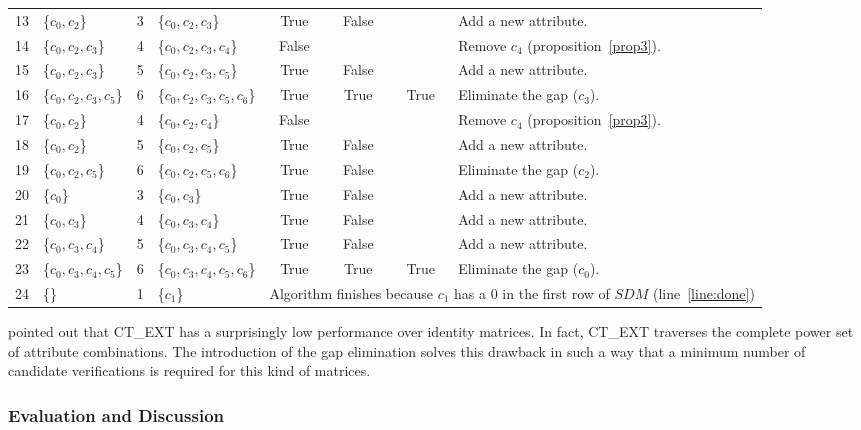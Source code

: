 \documentclass[authoryear,11pt]{elsarticle}
\begin{document}
\begin{table}[!htb]
\begin{tabular}{|c|l|c|l|c|c|c|l|}
    		13 & \{$c_0,c_2$\} 			& 3 & \{$c_0,c_2,c_3$\}			& True & False &   & Add a new attribute.\\
    		14 & \{$c_0,c_2,c_3$\} 		& 4 & \{$c_0,c_2,c_3,c_4$\}		& False &   &   & Remove $c_4$ (proposition~\ref{prop3}).\\
    		15 & \{$c_0,c_2,c_3$\}		& 5 & \{$c_0,c_2,c_3,c_5$\}		& True & False &   & Add a new attribute.\\
    		16 & \{$c_0,c_2,c_3,c_5$\}	& 6 & \{$c_0,c_2,c_3,c_5,c_6$\} 	& True & True & True & Eliminate the gap ($c_3$).\\
    		17 & \{$c_0,c_2$\} 			& 4 & \{$c_0,c_2,c_4$\}			& False &   &   & Remove $c_4$ (proposition~\ref{prop3}).\\
    		18 & \{$c_0,c_2$\}			& 5 & \{$c_0,c_2,c_5$\}			& True & False &   & Add a new attribute.\\
    		19 & \{$c_0,c_2,c_5$\}		& 6 & \{$c_0,c_2,c_5,c_6$\}		& True & False &   & Eliminate the gap ($c_2$).\\
    		20 & \{$c_0$\} 				& 3 & \{$c_0,c_3$\}				& True & False &   & Add a new attribute.\\    		
    		21 & \{$c_0,c_3$\}			& 4 & \{$c_0,c_3,c_4$\}			& True & False &   & Add a new attribute.\\
    		22 & \{$c_0,c_3,c_4$\}		& 5 & \{$c_0,c_3,c_4,c_5$\}		& True & False &   & Add a new attribute.\\
    		23 & \{$c_0,c_3,c_4,c_5$\}	& 6 & \{$c_0,c_3,c_4,c_5,c_6$\} 	& True & True & True & Eliminate the gap ($c_0$).\\
    		\hline
    		24 & \{\} 					& 1 & \{$c_1$\} 					& 
    		\multicolumn{4}{l|}{\scriptsize Algorithm finishes because $c_1$ has a 0 in the first row of $SDM$ (line~\ref{line:done})}\\
    		\hline
		\end{tabular}
	\end{table}
	
	\cite{Alba14} pointed out that CT\_EXT has a surprisingly low performance over identity matrices. 
	In fact, CT\_EXT traverses the complete power set of attribute combinations. The introduction of
	the gap elimination solves this drawback in such a way that a minimum number of candidate 
	verifications is required for this kind of matrices.

\subsubsection{Evaluation and Discussion}
\end{document}
